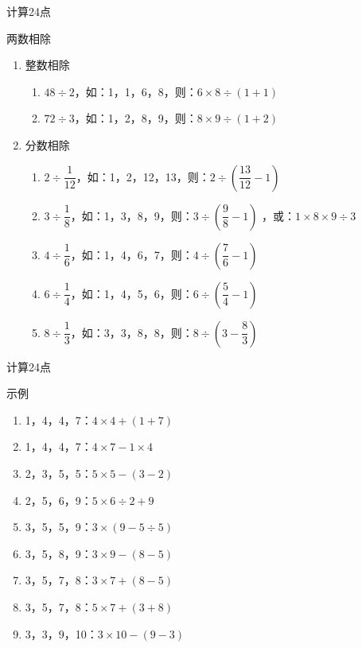 \documentclass[aspectratio=169]{ctexbeamer} %
\begin{document}
\begin{frame}[t]{计算24点}
\begin{spacing}{1.0}
\normalsize
\alert{两数相除}
\begin{enumerate}[label={\arabic*.}]
\item 整数相除
	\begin{enumerate}[label={\Alph*.}]
	\item $48 \div 2$，如：1，1，6，8，则：$6 \times 8 \div (1 + 1)$
	\item $72 \div 3$，如：1，2，8，9，则：$8 \times 9 \div (1 + 2)$
	\end{enumerate}
\item 分数相除
	\begin{enumerate}[label={\Alph*.}]
	\item $2 \div \dfrac{1}{12}$，如：1，2，12，13，则：$2 \div \left(\dfrac{13}{12} - 1 \right)$
	\item $3 \div \dfrac{1}{8}$，如：1，3，8，9，则：$3 \div \left(\dfrac{9}{8} - 1 \right)$	，或：$1 \times 8 \times 9 \div 3$
	\item $4 \div \dfrac{1}{6}$，如：1，4，6，7，则：$4 \div \left(\dfrac{7}{6} - 1 \right)$	
	\item $6 \div \dfrac{1}{4}$，如：1，4，5，6，则：$6 \div \left(\dfrac{5}{4} - 1 \right)$	
	\item $8 \div \dfrac{1}{3}$，如：3，3，8，8，则：$8 \div \left(3 - \dfrac{8}{3} \right)$	
	\end{enumerate}
\end{enumerate}
\end{spacing}
\end{frame}

\begin{frame}[t]{计算24点}
\begin{spacing}{1.2}
\normalsize
\alert{示例}
\begin{enumerate}[label={\arabic*.}]
\item 1，4，4，7：\pause $4 \times 4 + (1+ 7)$
\item 1，4，4，7：\pause $4 \times 7 - 1 \times 4$
\item 2，3，5，5：\pause $5 \times 5 - (3 - 2)$
\item 2，5，6，9：\pause $5 \times 6 \div 2 + 9$
\item 3，5，5，9：\pause $3 \times (9 - 5 \div 5)$
\item 3，5，8，9：\pause $3 \times 9 - (8 - 5)$
\item 3，5，7，8：\pause $3 \times 7 + (8 - 5)$
\item 3，5，7，8：\pause $5 \times 7 + (3 + 8)$
\item 3，3，9，10：\pause $3 \times 10 - (9 - 3)$
\end{enumerate}
\end{spacing}
\end{frame}
\end{document}
